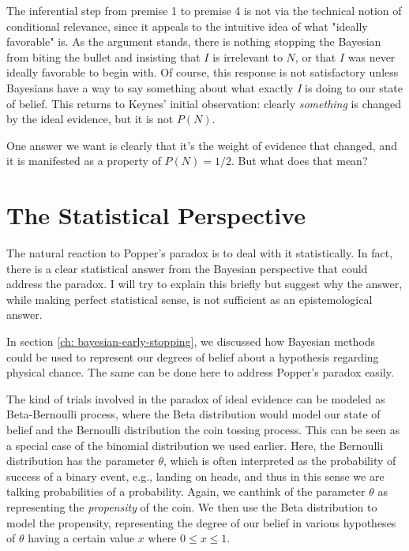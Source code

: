 The inferential step from premise 1 to premise 4 is not via the technical 
notion of conditional relevance, since it appeals to the intuitive idea of what "ideally favorable" is. As the argument stands, there is nothing stopping 
the Bayesian from biting the bullet and insisting that \(I\) is
irrelevant to \(N\), or that \(I\) was never ideally favorable to begin
with. Of course, this response is not satisfactory unless Bayesians have a way
to say something about what exactly \emph{I} is doing to our state of
belief. This returns to Keynes' initial observation: clearly
\emph{something} is changed by the ideal evidence, but it is not
\(P(N)\). 

One answer we want is clearly that it's the weight of evidence that changed,
and it is manifested as a property of \(P(N) = 1/2\). But what does that mean?

\hypertarget{the-statistical-perspective-1}{%
\section{The Statistical
Perspective}\label{the-statistical-perspective-1}}

The natural reaction to Popper's paradox is to deal with it statistically. In fact, there is a clear statistical answer from the Bayesian perspective that
could address the paradox. I will try to explain this briefly but
suggest why the answer, while making perfect statistical sense, is not
sufficient as an epistemological answer.

In section \ref{ch: bayesian-early-stopping}, we discussed how Bayesian methods could be used to represent
our degrees of belief about a hypothesis regarding physical chance. The
same can be done here to address Popper's paradox easily.

The kind of trials involved in the paradox of ideal evidence can be
modeled as Beta-Bernoulli process, where the Beta distribution would
model our state of belief and the Bernoulli distribution the coin
tossing process. This can be seen as a special case of the binomial
distribution we used earlier. Here, the Bernoulli distribution has the
parameter \(\theta\), which is often interpreted as the probability of
success of a binary event, e.g., landing on heads, and thus in this
sense we are talking probabilities of a probability. Again, we canthink
of the parameter \(\theta\) as representing the \emph{propensity} of the
coin. We then use the Beta distribution to model the propensity,
representing the degree of our belief in various hypotheses of
\(\theta\) having a certain value \(x\) where \(0 \leq x \leq 1\).

